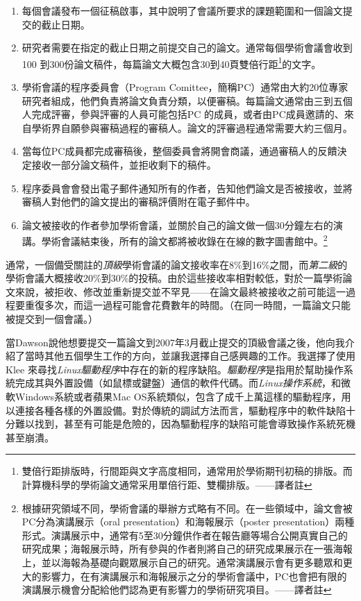 \documentclass[12pt,UTF8,nofonts]{book}
\begin{document}
\begin{enumerate}
\item 每個會議發布一個征稿啟事，其中說明了會議所要求的課題範圍和一個論文提交的截止日期。
\item 研究者需要在指定的截止日期之前提交自己的論文。通常每個學術會議會收到100 到300份論文稿件，每篇論文大概包含30到40頁雙倍行距\footnote{雙倍行距排版時，行間距與文字高度相同，通常用於學術期刊初稿的排版。而計算機科學的學術論文通常采用單倍行距、雙欄排版。——譯者註}的文字。
\item 學術會議的程序委員會（Program Comittee，簡稱PC）通常由大約20位專家研究者組成，他們負責將論文負責分類，以便審稿。每篇論文通常由三到五個人完成評審，參與評審的人員可能包括PC 的成員，或者由PC成員邀請的、來自學術界自願參與審稿過程的審稿人。論文的評審過程通常需要大約三個月。
\item 當每位PC成員都完成審稿後，整個委員會將開會商議，通過審稿人的反饋決定接收一部分論文稿件，並拒收剩下的稿件。
\item 程序委員會會發出電子郵件通知所有的作者，告知他們論文是否被接收，並將審稿人對他們的論文提出的審稿評價附在電子郵件中。
\item 論文被接收的作者參加學術會議，並關於自己的論文做一個30分鐘左右的演講。學術會議結束後，所有的論文都將被收錄在在線的數字圖書館中。\footnote{根據研究領域不同，學術會議的舉辦方式略有不同。在一些領域中，論文會被PC分為演講展示（oral presentation）和海報展示（poster presentation）兩種形式。演講展示中，通常有5至30分鐘供作者在報告廳等場合公開真實自己的研究成果；海報展示時，所有參與的作者則將自己的研究成果展示在一張海報上，並以海報為基礎向觀眾展示自己的研究。通常演講展示會有更多聽眾和更大的影響力，在有演講展示和海報展示之分的學術會議中，PC也會把有限的演講展示機會分配給他們認為更有影響力的學術研究項目。——譯者註}
\end{enumerate}

通常，一個備受關註的\emph{頂級}學術會議的論文接收率在8\%到16\%之間，而\emph{第二級}的學術會議大概接收20\%到30\%的投稿。由於這些接收率相對較低，對於一篇學術論文來說，被拒收、修改並重新提交並不罕見——在論文最終被接收之前可能這一過程要重復多次，而這一過程可能會花費數年的時間。（在同一時間，一篇論文只能被提交到一個會議。）

\breakline

當Dawson說他想要提交一篇論文到2007年3月截止提交的頂級會議之後，他向我介紹了當時其他五個學生工作的方向，並讓我選擇自己感興趣的工作。我選擇了使用Klee 來尋找\emph{Linux驅動程序}中存在的新的程序缺陷。\emph{驅動程序}是指用於幫助操作系統完成其與外置設備（如鼠標或鍵盤）通信的軟件代碼。而\emph{Linux操作系統}，和微軟Windows系統或者蘋果Mac OS系統類似，包含了成千上萬這樣的驅動程序，用以連接各種各樣的外置設備。對於傳統的調試方法而言，驅動程序中的軟件缺陷十分難以找到，甚至有可能是危險的，因為驅動程序的缺陷可能會導致操作系統死機甚至崩潰。
\end{document}
